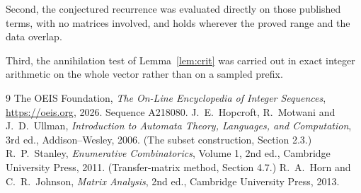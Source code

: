 \documentclass[11pt,a4paper]{article}
\theoremstyle{plain}
\theoremstyle{definition}
\begin{document}
Second, the conjectured recurrence was evaluated directly on those published terms, with no
matrices involved, and holds wherever the proved range and the data overlap.

Third, the annihilation test of Lemma~\ref{lem:crit} was carried out in exact integer
arithmetic on the whole vector rather than on a sampled prefix.

\begin{thebibliography}{9}
 The OEIS Foundation, \emph{The On-Line Encyclopedia of Integer
Sequences}, \url{https://oeis.org}, 2026. Sequence A218080.
 J.~E.~Hopcroft, R.~Motwani and J.~D.~Ullman, \emph{Introduction to Automata
Theory, Languages, and Computation}, 3rd ed., Addison--Wesley, 2006. (The subset
construction, Section 2.3.)
 R.~P.~Stanley, \emph{Enumerative Combinatorics}, Volume 1, 2nd ed.,
Cambridge University Press, 2011. (Transfer-matrix method, Section 4.7.)
 R.~A.~Horn and C.~R.~Johnson, \emph{Matrix Analysis}, 2nd ed., Cambridge
University Press, 2013.
\end{thebibliography}
\end{document}
